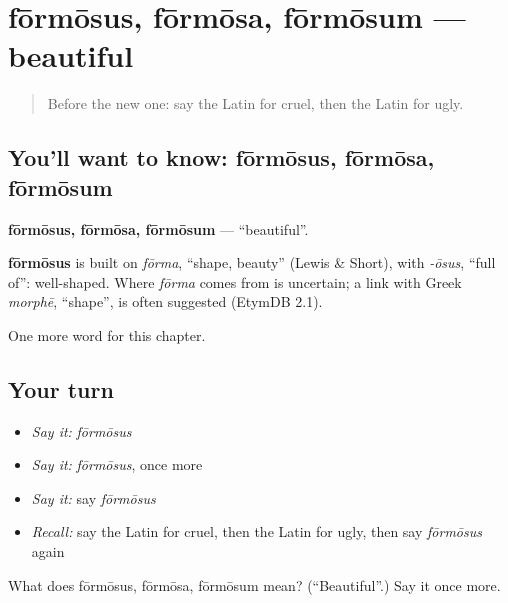 \section[fōrmōsus, fōrmōsa, fōrmōsum]{fōrmōsus, fōrmōsa, fōrmōsum — beautiful}

\label{lesson:LA-C151-formosus}



\begin{quote}
Before the new one: say the Latin for cruel, then the Latin for ugly.
\end{quote}

\subsection*{You'll want to know: fōrmōsus, fōrmōsa, fōrmōsum}
\textbf{fōrmōsus, fōrmōsa, fōrmōsum} — \textquotedblleft{}beautiful\textquotedblright{}.

\begin{cousinweb}
\textbf{fōrmōsus} is built on \emph{fōrma}, \textquotedblleft{}shape, beauty\textquotedblright{} (Lewis \& Short), with \emph{-ōsus}, \textquotedblleft{}full of\textquotedblright{}: well-shaped. Where \emph{fōrma} comes from is uncertain; a link with Greek \emph{morphē}, \textquotedblleft{}shape\textquotedblright{}, is often suggested (EtymDB 2.1).
\end{cousinweb}

\begin{grammarlens}[title={What you've built}]
One more word for this chapter.
\end{grammarlens}

\subsection*{Your turn}
\begin{itemize}
\raggedright
  \item \emph{Say it:} \emph{fōrmōsus}
  \item \emph{Say it:} \emph{fōrmōsus}, once more
  \item \emph{Say it:} say \emph{fōrmōsus}
  \item \emph{Recall:} say the Latin for cruel, then the Latin for ugly, then say \emph{fōrmōsus} again
\end{itemize}

\begin{tcolorbox}[breakable,colback=teal!4,colframe=teal!35!black,title={Before you move on}]
What does fōrmōsus, fōrmōsa, fōrmōsum mean? (\textquotedblleft{}Beautiful\textquotedblright{}.) Say it once more.
\end{tcolorbox}
